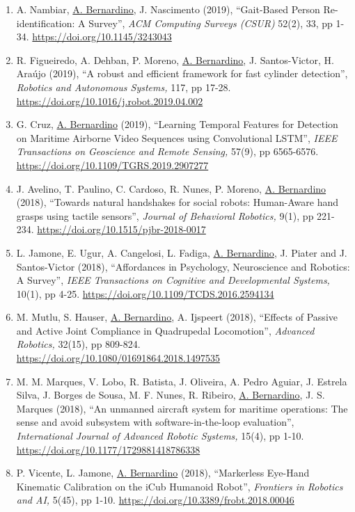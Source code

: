 \documentclass[
]{article}
\begin{document}
\begin{enumerate}
\item
  A. Nambiar, \ul{A. Bernardino}, J. Nascimento (2019), ``Gait-Based
  Person Re-identification: A Survey'', \emph{ACM Computing Surveys
  (CSUR)} 52(2), 33, pp 1-34. \url{https://doi.org/10.1145/3243043}~
\item
  R. Figueiredo, A. Dehban, P. Moreno, \ul{A. Bernardino}, J.
  Santos-Victor, H. Araújo (2019), ``A robust and efficient framework
  for fast cylinder detection'', \emph{Robotics and Autonomous Systems,}
  117, pp 17-28. \url{https://doi.org/10.1016/j.robot.2019.04.002}~
\item
  G. Cruz, \ul{A. Bernardino} (2019), ``Learning Temporal Features for
  Detection on Maritime Airborne Video Sequences using Convolutional
  LSTM'', \emph{IEEE Transactions on Geoscience and Remote Sensing,}
  57(9), pp 6565-6576.
  \url{https://doi.org/10.1109/TGRS.2019.2907277}~~~
\item
  J. Avelino, T. Paulino, C. Cardoso, R. Nunes, P. Moreno, \ul{A.
  Bernardino} (2018), ``Towards natural handshakes for social robots:
  Human-Aware hand grasps using tactile sensors'', \emph{Journal of
  Behavioral Robotics,} 9(1), pp 221-234.
  \url{https://doi.org/10.1515/pjbr-2018-0017}~
\item
  L. Jamone, E. Ugur, A. Cangelosi, L. Fadiga, \ul{A. Bernardino}, J.
  Piater and J. Santos-Victor (2018), ``Affordances in Psychology,
  Neuroscience and Robotics: A Survey'', \emph{IEEE Transactions on
  Cognitive and Developmental Systems,} 10(1), pp 4-25.
  \url{https://doi.org/10.1109/TCDS.2016.2594134}~
\item
  M. Mutlu, S. Hauser, \ul{A. Bernardino}, A. Ijspeert (2018), ``Effects
  of Passive and Active Joint Compliance in Quadrupedal Locomotion'',
  \emph{Advanced Robotics,} 32(15), pp 809-824.
  \url{https://doi.org/10.1080/01691864.2018.1497535}~
\item
  M. M. Marques, V. Lobo, R. Batista, J. Oliveira, A. Pedro Aguiar, J.
  Estrela Silva, J. Borges de Sousa, M. F. Nunes, R. Ribeiro, \ul{A.
  Bernardino}, J. S. Marques (2018), ``An unmanned aircraft system for
  maritime operations: The sense and avoid subsystem with
  software-in-the-loop evaluation'', \emph{International Journal of
  Advanced Robotic Systems,} 15(4), pp 1-10.
  \url{https://doi.org/10.1177/1729881418786338}~
\item
  P. Vicente, L. Jamone, \ul{A. Bernardino} (2018), ``Markerless
  Eye-Hand Kinematic Calibration on the iCub Humanoid Robot'',
  \emph{Frontiers in Robotics and AI,} 5(45), pp 1-10.
  \url{https://doi.org/10.3389/frobt.2018.00046}~

\end{enumerate}
\end{document}
